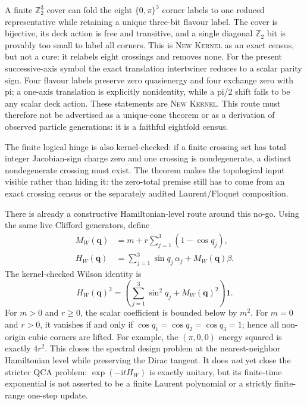 \documentclass[11pt]{article}
\newcommand{\Kernel}{\textcolor{kernelcolor}{\textsc{Kernel}}}
\newcommand{\NewResult}{\textsc{New}}
\newcommand{\ii}{\mathrm{i}}
\newcommand{\id}{\mathbf{1}}
\begin{document}
A finite $\mathbb Z_2^3$ cover can fold the eight $\{0,\pi\}^3$ corner labels
to one reduced representative while retaining a unique three-bit flavour
label.  The cover is bijective, its deck action is free and transitive, and a
single diagonal $\mathbb Z_2$ bit is provably too small to label all corners.
This is \NewResult{} \Kernel{} as an exact census, but not a cure: it relabels
eight crossings and removes none.  For the present successive-axis symbol the
exact translation intertwiner reduces to a scalar parity sign.  Four flavour
labels preserve zero quasienergy and four exchange zero with pi; a one-axis
translation is explicitly nonidentity, while a pi/2 shift fails to be any
scalar deck action.  These statements are \NewResult{} \Kernel{}.  This route
must therefore not be advertised as a unique-cone theorem or as a derivation
of observed particle generations: it is a faithful eightfold census.

The finite logical hinge is also kernel-checked: if a finite crossing set has
total integer Jacobian-sign charge zero and one crossing is nondegenerate, a
distinct nondegenerate crossing must exist.  The theorem makes the topological
input visible rather than hiding it: the zero-total premise still has to come
from an exact crossing census or the separately audited Laurent/Floquet
composition.

There is already a constructive Hamiltonian-level route around this no-go.
Using the same live Clifford generators, define
\begin{align}
 M_W(\mathbf q)&=m+r\sum_{j=1}^{3}(1-\cos q_j),\\
 H_W(\mathbf q)&=\sum_{j=1}^{3}\sin q_j\,\alpha_j+M_W(\mathbf q)\beta.
\end{align}
The kernel-checked Wilson identity is
\begin{equation}\label{eq:wilsonsquare}
 H_W(\mathbf q)^2=
 \left(\sum_{j=1}^{3}\sin^2q_j+M_W(\mathbf q)^2\right)\id.
\end{equation}
For $m>0$ and $r\geq0$, the scalar coefficient is bounded below by $m^2$.
For $m=0$ and $r>0$, it vanishes if and only if
$\cos q_1=\cos q_2=\cos q_3=1$; hence all non-origin cubic corners are lifted.
For example, the $(\pi,0,0)$ energy squared is exactly $4r^2$.  This closes
the spectral design problem at the nearest-neighbor Hamiltonian level while
preserving the Dirac tangent.  It does \emph{not} yet close the stricter QCA
problem: $\exp(-\ii tH_W)$ is exactly unitary, but its finite-time exponential
is not asserted to be a finite Laurent polynomial or a strictly finite-range
one-step update.
\end{document}
